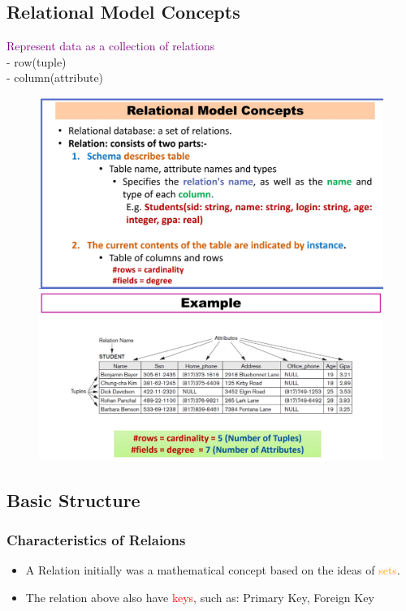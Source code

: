 \documentclass[a4paper, 12pt]{article}
\begin{document}
    \subsection{Relational Model Concepts}
    \textcolor{purple}{Represent data as a collection of relations}\\
    - row(tuple)\\
    - column(attribute)
    \begin{figure}[H]
        \includegraphics[width=\textwidth]{chapter1a_2.png}
        \includegraphics[width=\textwidth]{chapter1a_3.png}
    \end{figure}
    \vspace{3cm}
    \subsection{Basic Structure}
    \subsubsection{Characteristics of Relaions}
        \begin{itemize}
            \item A Relation initially was a mathematical concept based on the ideas of \textcolor{orange}{sets}.
            \item The relation above also have \textcolor{red}{keys}, such as: Primary Key, Foreign Key
        \end{itemize}
\end{document}
